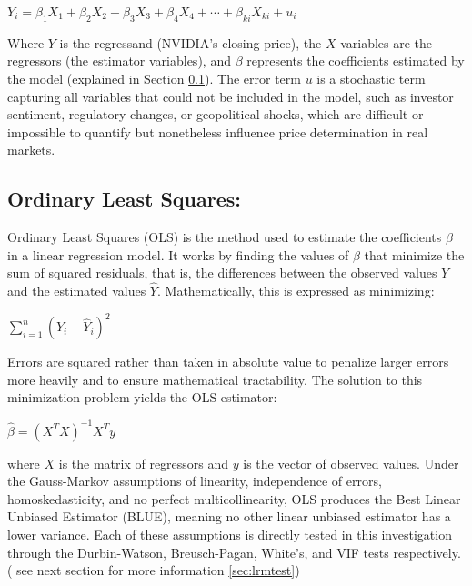 \documentclass[12pt]{article}
\begin{document}
    $
    Y_i = \beta_1 X_1 + \beta_2 X_2 + \beta_3 X_3 + \beta_4 X_4 + \cdots + \beta_{ki} X_{ki} + u_i
    $
    
    Where $Y$ is the regressand (NVIDIA's closing price), the $X$ variables are the regressors (the estimator variables), and $\beta$ represents the coefficients estimated by the model (explained in Section \ref{subsec:ols}). The error term $u$ is a stochastic term capturing all variables that could not be included in the model, such as investor sentiment, regulatory changes, or geopolitical shocks, which are difficult or impossible to quantify but nonetheless influence price determination in real markets.
    
    \subsection{Ordinary Least Squares: } \label{subsec:ols}
    
    Ordinary Least Squares (OLS) is the method used to estimate the coefficients $\beta$ in a linear regression model. It works by finding the values of $\beta$ that minimize the sum of squared residuals, that is, the differences between the observed values $Y$ and the estimated values $\hat{Y}$. Mathematically, this is expressed as minimizing: 
    
    \begin{center}
        $\sum_{i=1}^{n}(Y_i - \hat{Y}_i)^2$ 
    \end{center}
    
    Errors are squared rather than taken in absolute value to penalize larger errors more heavily and to ensure mathematical tractability. The solution to this minimization problem yields the OLS estimator:
    
    \begin{center}
        $
        \hat{\beta} = (X^TX)^{-1}X^Ty
        $
    \end{center}
    
    where $X$ is the matrix of regressors and $y$ is the vector of observed values. Under the Gauss-Markov assumptions of linearity, independence of errors, homoskedasticity, and no perfect multicollinearity, OLS produces the Best Linear Unbiased Estimator (BLUE), meaning no other linear unbiased estimator has a lower variance. Each of these assumptions is directly tested in this investigation through the Durbin-Watson, Breusch-Pagan, White's, and VIF tests respectively. ( see next section for more information \ref{sec:lrmtest})
    
\end{document}
